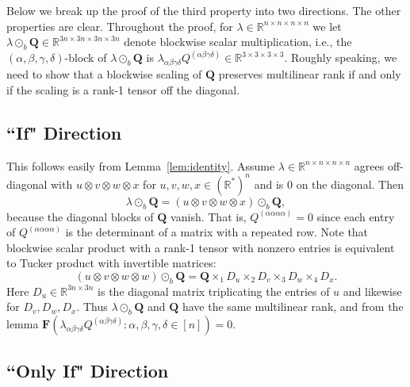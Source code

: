 \documentclass[11pt]{amsart}
\begin{document}
Below we break up the proof of the third property into two directions.  
The other properties are clear.   
Throughout the proof, for $\lambda \in \mathbb{R}^{n \times n \times n \times n}$ we let $\lambda \odot_{b} \mathbf{Q} \in \mathbb{R}^{3n \times 3n \times 3n \times 3n}$ denote blockwise scalar multiplication, i.e., 
the $(\alpha, \beta, \gamma, \delta)$-block of $\lambda \odot_{b} \mathbf{Q}$ is $\lambda_{\alpha \beta \gamma \delta} Q^{(\alpha \beta \gamma \delta)} \in \mathbb{R}^{3 \times 3 \times 3 \times 3}$.
Roughly speaking, we need to show that a blockwise scaling of $\mathbf{Q}$ preserves multilinear rank if and only if the scaling is a rank-1 tensor off the diagonal.

\medskip

\subsection*{``If" Direction}
This follows easily from Lemma~\ref{lem:identity}.
Assume $\lambda \in \mathbb{R}^{n \times n \times n \times n}$ agrees off-diagonal with $u \otimes v \otimes w \otimes x$ for $u,v,w,x \in (\mathbb{R}^{*})^n$ and is $0$ on the diagonal.
Then
\begin{equation*}
\lambda \odot_b \mathbf{Q} = (u \otimes v \otimes w \otimes x) \odot_b \mathbf{Q},
\end{equation*}
because the diagonal blocks of $\mathbf{Q}$ vanish.  That is,
$
Q^{(\alpha \alpha \alpha \alpha)} = 0
$
since each entry of $Q^{(\alpha \alpha \alpha \alpha)}$ is the determinant of a matrix with a repeated row.
Note that blockwise scalar product with a rank-1 tensor with nonzero entries is equivalent to Tucker product with invertible matrices:
\begin{equation*}
(u \otimes v \otimes w \otimes w) \odot_b \mathbf{Q} = \mathbf{Q} \times_1 D_u \times_2 D_v \times_3 D_w \times_4 D_x.
\end{equation*}
Here $D_u \in \mathbb{R}^{3n \times 3n}$ is the diagonal matrix triplicating the entries of $u$ and likewise for $D_v, D_w, D_x$.
Thus $\lambda \odot_b \mathbf{Q}$ and $\mathbf{Q}$ have the same multilinear rank, and from the lemma $\mathbf{F}(\lambda_{\alpha \beta \gamma \delta} Q^{(\alpha \beta \gamma \delta)} : \alpha, \beta, \gamma, \delta \in [n]) = 0$.

\medskip

\subsection*{``Only If" Direction}
\end{document}

